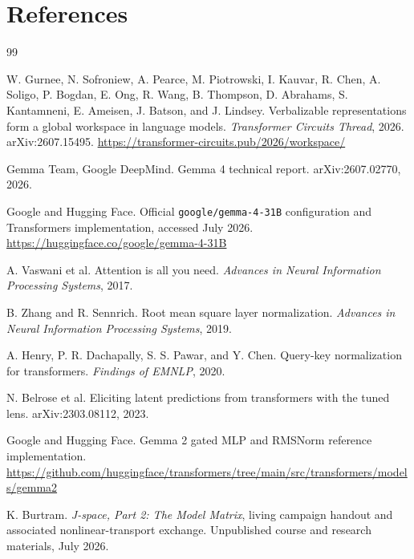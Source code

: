 \documentclass[11pt]{article}
\theoremstyle{definition}
\theoremstyle{remark}
\begin{document}
\section*{References}
\small
\begin{thebibliography}{99}

W. Gurnee, N. Sofroniew, A. Pearce, M. Piotrowski, I. Kauvar, R. Chen, A. Soligo, P. Bogdan, E. Ong, R. Wang, B. Thompson, D. Abrahams, S. Kantamneni, E. Ameisen, J. Batson, and J. Lindsey.
\newblock Verbalizable representations form a global workspace in language models.
\newblock \emph{Transformer Circuits Thread}, 2026. arXiv:2607.15495.
\newblock \url{https://transformer-circuits.pub/2026/workspace/}

Gemma Team, Google DeepMind.
\newblock Gemma 4 technical report.
\newblock arXiv:2607.02770, 2026.

Google and Hugging Face.
\newblock Official \texttt{google/gemma-4-31B} configuration and Transformers implementation, accessed July 2026.
\newblock \url{https://huggingface.co/google/gemma-4-31B}

A. Vaswani et al.
\newblock Attention is all you need.
\newblock \emph{Advances in Neural Information Processing Systems}, 2017.

B. Zhang and R. Sennrich.
\newblock Root mean square layer normalization.
\newblock \emph{Advances in Neural Information Processing Systems}, 2019.

A. Henry, P. R. Dachapally, S. S. Pawar, and Y. Chen.
\newblock Query-key normalization for transformers.
\newblock \emph{Findings of EMNLP}, 2020.

N. Belrose et al.
\newblock Eliciting latent predictions from transformers with the tuned lens.
\newblock arXiv:2303.08112, 2023.

Google and Hugging Face.
\newblock Gemma 2 gated MLP and RMSNorm reference implementation.
\newblock \url{https://github.com/huggingface/transformers/tree/main/src/transformers/models/gemma2}

K. Burtram.
\newblock \emph{J-space, Part 2: The Model Matrix}, living campaign handout and associated nonlinear-transport exchange.
\newblock Unpublished course and research materials, July 2026.

\end{thebibliography}
\end{document}

